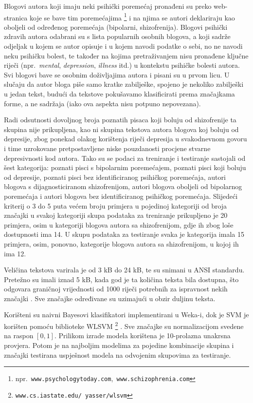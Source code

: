\documentclass[10pt, a4paper]{article}
\begin{document}
Blogovi autora koji imaju neki psihički poremećaj pronađeni su preko web-stranica koje se bave tim poremećajima \footnote{npr.~\texttt{www.psychologytoday.com},\texttt{ www.schizophrenia.com}} i na njima se autori deklariraju kao oboljeli od određenog poremećaja (bipolarni, shizofrenija). Blogovi psihički zdravih autora odabrani su s lista popularnih osobnih blogova, a koji sadrže odjeljak u kojem se autor opisuje i u kojem navodi podatke o sebi, no ne navodi neku psihičku bolest, te također na kojima pretraživanjem nisu pronađene ključne riječi (npr.~\emph{mental}, \emph{depression}, \emph{illness} itd.) u kontekstu psihičke bolesti autora. Svi blogovi bave se osobnim doživljajima autora i pisani su u prvom licu. U slučaju da autor bloga piše samo kratke zabilješke, spojeno je nekoliko zabilješki u jedan tekst, budući da tekstove pokušavamo klasificirati prema značajkama forme, a ne sadržaja (iako ova aspekta nisu potpuno nepovezana).

Radi odsutnosti dovoljnog broja poznatih pisaca koji boluju od shizofrenije ta skupina nije prikupljena, kao ni skupina tekstova autora blogova koj boluju od depresije, zbog ponekad olakog korištenja riječi depresija u svakodnevnom govoru i time uzrokovane pretpostavljene niske pouzdanosti procjene stvarne depresivnosti kod autora. Tako su se podaci za treniranje i testiranje sastojali od šest kategorija: poznati pisci s bipolarnim poremećajem, poznati pisci koji boluju od depresije, poznati pisci bez identificiranog psihičkog poremećaja, autori blogova s dijagnosticiranom shizofrenijom, autori blogova oboljeli od bipolarnog poremećaja i autori blogova bez identificiranog psihičkog poremećaja. Slijedeći kriterij o 3 do 5 puta većem broju primjera u pojedinoj kategoriji od broja značajki \citep{ribaric} u svakoj kategoriji skupa podataka za treniranje prikupljeno je 20 primjera, osim u kategoriji blogova autora sa shizofrenijom, gdje ih zbog loše dostupnosti ima 14. U skupu podataka za testiranje svaka je kategorija imala 15 primjera, osim, ponovno, kategorije blogova autora sa shizofrenijom, u kojoj ih ima 12. 

Veličina tekstova varirala je od 3 kB do 24 kB, te su snimani u ANSI standardu. Pretežno su imali iznad 5 kB, kada god je ta količina teksta bila dostupna, što odgovara graničnoj vrijednosti od 1000 riječi potrebnih za ispravnost nekih značajki  \citep{tweedie}. Sve značajke određivane su uzimajući u obzir duljinu teksta. 
 
Korišteni su naivni Bayesovi klasifikatori implementirani u Weka-i, dok je SVM je korišten pomoću biblioteke WLSVM \footnote{\texttt{www.cs.iastate.edu/~yasser/wlsvm}} \citep{yh05}. Sve značajke su normalizacijom svedene na raspon $ [0,1]$. Prilikom izrade modela korištena je 10-prolazna unakrsna provjera. Potom je na najboljim modelima za pojedine kombinacije skupina i značajki testirana uspješnost modela na odvojenim skupovima za testiranje.
\end{document}
